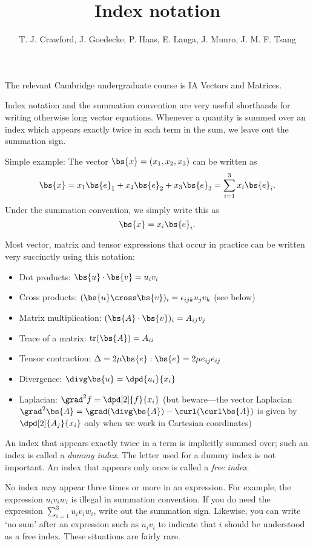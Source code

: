 \documentclass{article}
\title{Index notation}
\author{T. J. Crawford, J. Goedecke, P. Haas, E. Lauga, J. Munro, J. M. F. Tsang}
\begin{document}
\maketitle

The relevant Cambridge undergraduate course is IA Vectors and Matrices.

Index notation and the summation convention are very useful shorthands for writing otherwise long vector equations. Whenever a quantity is summed over an index which appears exactly twice in each term in the sum, we leave out the summation sign.

Simple example: The vector $\bs{x} = (x_1,x_2,x_3)$ can be written as 
$$ \bs{x} = x_1 \bs{e}_1 + x_2 \bs{e}_2 + x_3 \bs{e}_3 = \sum_{i=1}^3 x_i\bs{e}_i. $$
Under the summation convention, we simply write this as
$$ \bs{x} = x_i \bs{e}_i. $$

Most vector, matrix and tensor expressions that occur in practice can be written
very succinctly using this notation:
\begin{itemize}
    \item Dot products: $ \bs{u}\cdot\bs{v} = u_iv_i $
    \item Cross products: $ (\bs{u}\cross\bs{v})_i = \epsilon_{ijk}u_jv_k $ (see below) 
    \item Matrix multiplication: $(\bs{A}\cdot\bs{v})_i = A_{ij}v_j$
    \item Trace of a matrix: $\mathrm{tr}(\bs{A}) = A_{ii}$
    \item Tensor contraction: $ \Delta = 2\mu\bs{e}:\bs{e} = 2\mu e_{ij}e_{ij} $
    \item Divergence: $\divg\bs{u} = \dpd{u_i}{x_i} $
    \item Laplacian: $\grad^2 f = \dpd[2]{f}{x_i} $ (but beware---the vector
    Laplacian $\grad^2\bs{A} = \grad(\divg\bs{A}) - \curl(\curl\bs{A})$ is given
    by $\dpd[2]{A_j}{x_i}$ only when we work in Cartesian coordinates)
\end{itemize}

An index that appears exactly twice in a term is implicitly summed over; such an index is called a \textit{dummy index}. The letter used for a dummy index is not important. An index that appears only once is called a \textit{free index}. 

No index may appear three times or more in an expression. For example, the expression $u_iv_iw_i$ is illegal in summation convention. If you do need the expression $\sum_{i=1}^3 u_iv_iw_i$, write out the summation sign. Likewise, you can write `no sum' after an expression such as $u_i v_i$ to indicate that $i$ should be understood as a free index. These situations are fairly rare.
\end{document}
